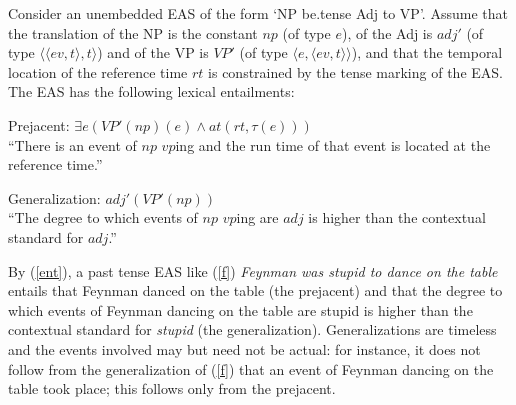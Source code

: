 \documentclass[11pt,fleqn]{article}
\newcommand{\6}{\mbox{$[\hspace*{-.6mm}[$}}
\newcommand{\9}{\mbox{$]\hspace*{-.6mm}]$}}
\begin{document}
\begin{exe}
\ex\label{ent} Consider an unembedded EAS of the form `NP be{\sc .tense} Adj to VP'. Assume that the translation of the NP is the constant $np$ (of type $e$), of the Adj is $adj'$ (of type $\langle \langle ev, t \rangle, t \rangle$) and of the VP is $VP'$ (of type $\langle e, \langle ev,  t\rangle \rangle$), and that the temporal location of the reference time $rt$ is constrained by the tense marking of the EAS. The EAS has the following lexical entailments:

\begin{xlist}

\ex Prejacent: $\exists e (VP'(np)(e) \wedge at(rt,\tau(e)))$ \\ ``There is an event of $np$ $vp$ing and the run time of that event is  located at the reference time.''

\ex Generalization: $adj'(VP'(np))$ \\ ``The degree to which events of $np$ $vp$ing are $adj$ is higher than the contextual standard for $adj$.''

\end{xlist}

%
%
%
%
%
%
%
%
%
%
\end{exe}
By (\ref{ent}), a past tense EAS like (\ref{f}) {\em Feynman was stupid to dance on the table} entails that Feynman danced on the table (the prejacent) and that the degree to which events of Feynman dancing on the table are stupid is higher than the contextual standard for {\em stupid} (the generalization). Generalizations are timeless and the events involved may but need not be actual: for instance, it does not follow from the generalization of (\ref{f}) that an event of Feynman dancing on the table took place; this follows only from the prejacent.
\end{document}
